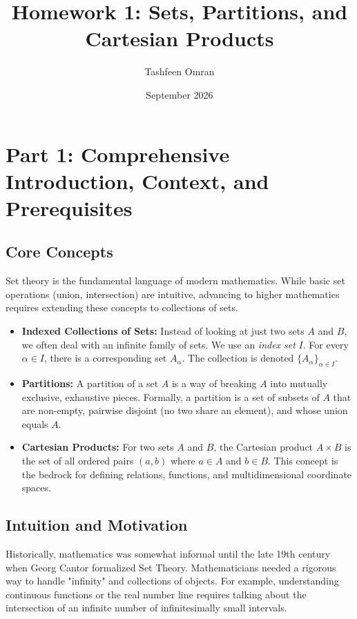 \documentclass[12pt]{article}
\title{\textbf{Homework 1: Sets, Partitions, and Cartesian Products}}
\author{Tashfeen Omran}
\date{September 2026}
\begin{document}
\maketitle
\tableofcontents
\newpage

\section{Part 1: Comprehensive Introduction, Context, and Prerequisites}

\subsection{Core Concepts}
Set theory is the fundamental language of modern mathematics. While basic set operations (union, intersection) are intuitive, advancing to higher mathematics requires extending these concepts to collections of sets. 

\begin{itemize}
    \item \textbf{Indexed Collections of Sets:} Instead of looking at just two sets $A$ and $B$, we often deal with an infinite family of sets. We use an \textit{index set} $I$. For every $\alpha \in I$, there is a corresponding set $A_\alpha$. The collection is denoted $\{A_\alpha\}_{\alpha \in I}$. 
    \item \textbf{Partitions:} A partition of a set $A$ is a way of breaking $A$ into mutually exclusive, exhaustive pieces. Formally, a partition is a set of subsets of $A$ that are non-empty, pairwise disjoint (no two share an element), and whose union equals $A$.
    \item \textbf{Cartesian Products:} For two sets $A$ and $B$, the Cartesian product $A \times B$ is the set of all ordered pairs $(a, b)$ where $a \in A$ and $b \in B$. This concept is the bedrock for defining relations, functions, and multidimensional coordinate spaces.
\end{itemize}

\subsection{Intuition and Motivation}
Historically, mathematics was somewhat informal until the late 19th century when Georg Cantor formalized Set Theory. Mathematicians needed a rigorous way to handle "infinity" and collections of objects. For example, understanding continuous functions or the real number line requires talking about the intersection of an infinite number of infinitesimally small intervals. 
\end{document}
